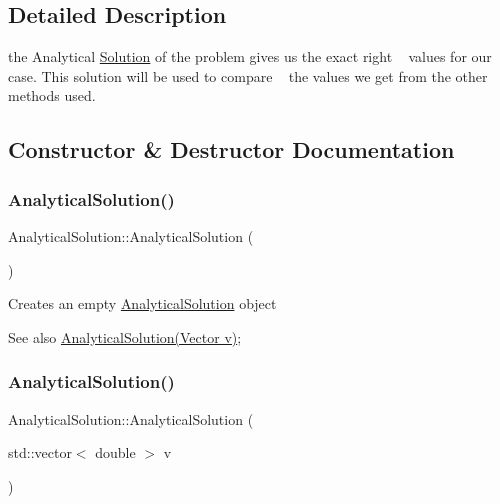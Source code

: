 \subsection{Detailed Description}
the Analytical \hyperlink{class_solution}{Solution} of the problem gives us the exact right ~\newline
 values for our case. This solution will be used to compare ~\newline
 the values we get from the other methods used. 

\subsection{Constructor \& Destructor Documentation}
\mbox{\label{class_analytical_solution_a92a4ce87e863ec7f8aac59372306efd2}} 
\subsubsection{\texorpdfstring{Analytical\+Solution()}{AnalyticalSolution()}\hspace{0.1cm}{\footnotesize\ttfamily [1/2]}}
{\footnotesize\ttfamily Analytical\+Solution\+::\+Analytical\+Solution (\begin{DoxyParamCaption}{ }\end{DoxyParamCaption})}

Creates an empty \hyperlink{class_analytical_solution}{Analytical\+Solution} object \begin{DoxySeeAlso}{See also}
\hyperlink{class_analytical_solution}{Analytical\+Solution(\+Vector v)}; 
\end{DoxySeeAlso}
\mbox{\label{class_analytical_solution_a9522a4a13b61dcc7f145e0fb39e5016d}} 
\subsubsection{\texorpdfstring{Analytical\+Solution()}{AnalyticalSolution()}\hspace{0.1cm}{\footnotesize\ttfamily [2/2]}}
{\footnotesize\ttfamily Analytical\+Solution\+::\+Analytical\+Solution (\begin{DoxyParamCaption}\item[{std\+::vector$<$ double $>$}]{v }\end{DoxyParamCaption})}

